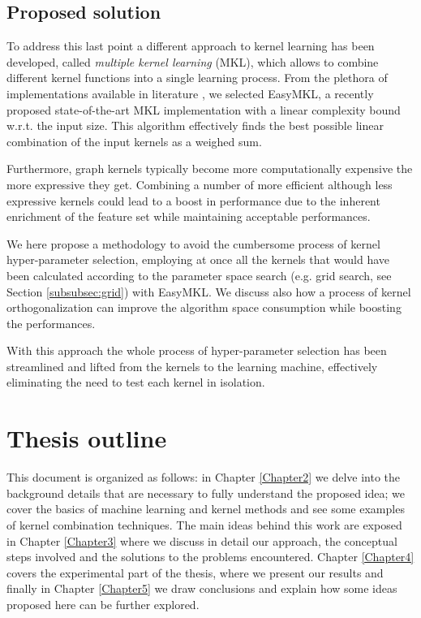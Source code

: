 \subsection{Proposed solution}

To address this last point a different approach to kernel learning has been developed,
called \emph{multiple kernel learning} (MKL), which allows to combine different
kernel functions into a single learning process.
From the plethora of implementations available in literature \cite{journals/jmlr/GonenA11},
we selected EasyMKL, a recently proposed state-of-the-art MKL implementation
\cite{aiolli2015easymkl} with a linear complexity bound w.r.t. the input size.
This algorithm effectively finds the best possible linear combination of the
input kernels as a weighed sum.

Furthermore, graph kernels typically become more computationally expensive the
more expressive they get.
Combining a number of more efficient although less expressive kernels could
lead to a boost in performance due to the inherent enrichment of the feature set
while maintaining acceptable performances.

We here propose a methodology to avoid the cumbersome process of kernel
hyper-parameter selection, employing at once all the kernels that would have been calculated
according to the parameter space search (e.g. grid search, see Section \ref{subsubsec:grid})
with EasyMKL.
We discuss also how a process of kernel orthogonalization can improve the algorithm space
consumption while boosting the performances.

With this approach the whole process of hyper-parameter selection has been streamlined and
lifted from the kernels to the learning machine, effectively eliminating the need to test each
kernel in isolation.


\section{Thesis outline}
This document is organized as follows: in Chapter \ref{Chapter2} we delve into
the background details that are necessary to fully understand the proposed idea;
we cover the basics of machine learning and kernel methods and see some examples
of kernel combination techniques.
The main ideas behind this work are exposed in Chapter \ref{Chapter3} where we
discuss in detail our approach, the conceptual steps involved and the solutions
to the problems encountered.
Chapter \ref{Chapter4} covers the experimental part of the thesis, where we present
our results and finally in Chapter \ref{Chapter5} we draw conclusions and explain
how some ideas proposed here can be further explored.


